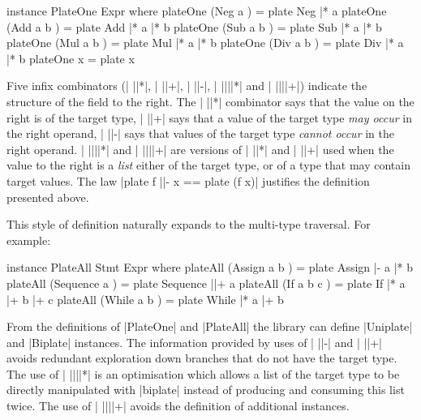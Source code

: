\begin{comment}
\begin{code}
class PlateAll from to where
    plateAll :: from -> Type from to
class PlateOne to where
    plateOne :: to -> Type to to
type Type from to = ([to] -> [to], [to] -> (from,[to]))
plate :: from -> Type from to
(|*) :: Type (to -> from) to -> to -> Type from to
(|+) :: PlateAll item to => Type (item -> from) to -> item -> Type from to
(|-) :: Type (item -> from) to -> item -> Type from to
(||*) :: Type ([to] -> from) to -> [to] -> Type from to
(||+) :: PlateAll item to => Type ([item] -> from) to -> [item] -> Type from to
\end{code}
\end{comment}

\begin{code}
instance PlateOne Expr where
    plateOne (Neg  a    )  = plate Neg  |* a
    plateOne (Add  a b  )  = plate Add  |* a |* b
    plateOne (Sub  a b  )  = plate Sub  |* a |* b
    plateOne (Mul  a b  )  = plate Mul  |* a |* b
    plateOne (Div  a b  )  = plate Div  |* a |* b
    plateOne x             = plate x
\end{code}

Five infix combinators (| ||*|, | ||+|, | ||-|, | ||||*| and | ||||+|) indicate the structure of the field to the right. The | ||*| combinator says that the value on the right is of the target type, | ||+| says that a value of the target type \textit{may occur} in the right operand, | ||-| says that values of the target type \textit{cannot occur} in the right operand. | ||||*| and | ||||+| are versions of | ||*| and | ||+| used when the value to the right is a \textit{list} either of the target type, or of a type that may contain target values. The law |plate f ||- x == plate (f x)| justifies the definition presented above.

This style of definition naturally expands to the multi-type traversal. For example:

\begin{code}
instance PlateAll Stmt Expr where
    plateAll (Assign    a b    ) = plate Assign    |-   a |*  b
    plateAll (Sequence  a      ) = plate Sequence  ||+  a
    plateAll (If        a b c  ) = plate If        |*   a |+  b |+ c
    plateAll (While     a b    ) = plate While     |*   a |+  b
\end{code}

From the definitions of |PlateOne| and |PlateAll| the library can define |Uniplate| and |Biplate| instances. The information provided by uses of | ||-| and | ||+| avoids redundant exploration down branches that do not have the target type. The use of | ||||*| is an optimisation which allows a list of the target type to be directly manipulated with |biplate| instead of producing and consuming this list twice. The use of | ||||+| avoids the definition of additional instances.

